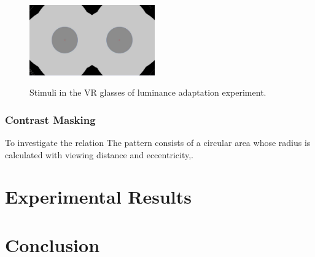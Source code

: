 \documentclass[journal]{IEEEtran}
\begin{document}
\begin{figure}[!t]
	\centering
	\includegraphics[width=0.48\textwidth]{ContrastSketch}\\
	\caption{Stimuli in the VR glasses of luminance adaptation experiment.}
	\label{fig:ContrastSketch}
	 
\end{figure}
\subsubsection{Contrast Masking}
To investigate the relation The pattern consists of a circular area whose radius is calculated with viewing distance and eccentricity,. 
\section{Experimental Results}

\section{Conclusion}


\ifCLASSOPTIONcaptionsoff
  \newpage
\fi

{
	\small
	
	
}
\end{document}
